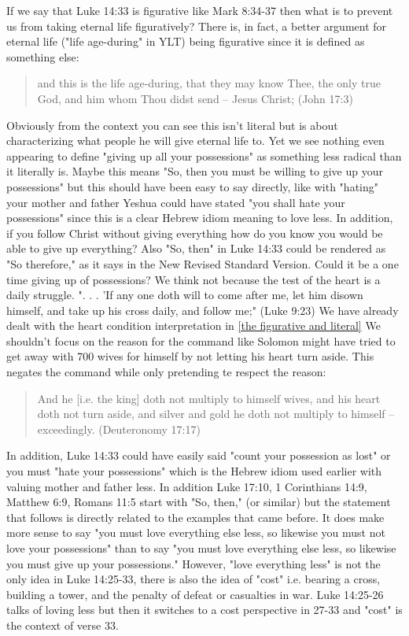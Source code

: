 \documentclass[11pt]{article}
\begin{document}
If we say that Luke 14:33 is figurative like Mark 8:34-37 then what is to prevent us from taking eternal life figuratively? There is, in fact, a better argument for eternal life ("life age-during" in YLT) being figurative since it is defined as something else: 
\begin{quote}
and this is the life age-during, that they may know Thee, the only true God, and him whom Thou didst send -- Jesus Christ; (John 17:3) 
\end{quote}
Obviously from the context you can see this isn't literal but is about characterizing what people he will give eternal life to. Yet we see nothing even appearing to define "giving up all your possessions" as something less radical than it literally is. 
Maybe this means "So, then you must be willing to give up your possessions" but this should have been easy to say directly, like with "hating" your mother and father Yeshua could have stated "you shall hate your possessions" since this is a clear Hebrew idiom meaning to love less. In addition, if you follow Christ without giving everything how do you know you would be able to give up everything? Also "So, then" in Luke 14:33 could be rendered as "So therefore," as it says in the New Revised Standard Version. Could it be a one time giving up of possessions? We think not because the test of the heart is a daily struggle. ". . . 'If any one doth will to come after me, let him disown himself, and take up his cross daily, and follow me;" (Luke 9:23) We have already dealt with the heart condition interpretation in \ref{the figurative and literal} We shouldn't focus on the reason for the command like Solomon might have tried to get away with 700 wives for himself by not letting his heart turn aside. This negates the command while only pretending te respect the reason:
\begin{quote}
 And he [i.e. the king] doth not multiply to himself wives, and his heart doth not turn aside, and silver and gold he doth not multiply to himself -- exceedingly. (Deuteronomy 17:17)
 \end{quote}
In addition, Luke 14:33 could have easily said "count your possession as lost" or you must "hate your possessions" which is the Hebrew idiom used earlier with valuing mother and father less. In addition Luke 17:10, 1 Corinthians 14:9, Matthew 6:9, Romans 11:5 start with "So, then," (or similar) but the statement that follows is directly related to the examples that came before. It does make more sense to say "you must love everything else less, so likewise you must not love your possessions" than to say "you must love everything else less, so likewise you must give up your possessions." However, "love everything less" is not the only idea in Luke 14:25-33, there is also the idea of "cost" i.e. bearing a cross, building a tower, and the penalty of defeat or casualties in war. Luke 14:25-26 talks of loving less but then it switches to a cost perspective in 27-33 and "cost" is the context of verse 33.
\end{document}
